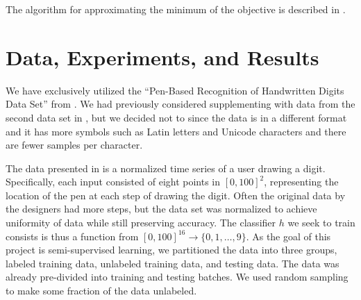 \documentclass[11pt]{article}
\begin{document}
The algorithm for approximating the minimum of the objective is described
in \cite{joachims2003transductive}.


\section{Data, Experiments, and Results}

We have exclusively utilized the ``Pen-Based Recognition of Handwritten Digits Data Set'' from \cite{Alpaydin:1998}. We had previously considered supplementing with data from the second data set in \cite{Llorens:2008}, but we decided not to since the data is in a different format and it has more symbols such as Latin letters and Unicode characters and there are fewer samples per character.

The data presented in \cite{Alpaydin:1998} is a normalized time series of a user drawing a digit. Specifically, each input consisted of eight points in $[0, 100]^2$, representing the location of the pen at each step of drawing the digit. Often the original data by the designers had more steps, but the data set was normalized to achieve uniformity of data while still preserving accuracy. The classifier $h$ we seek to train consists is thus a function from $[0, 100]^{16} \to \{0, 1, \hdots, 9\}$.  As the goal of this project is semi-supervised learning, we partitioned the data into three groups, labeled training data, unlabeled training data, and testing data. The data was already pre-divided into training and testing batches. We used random sampling to make some fraction of the data unlabeled. \par
\end{document}
